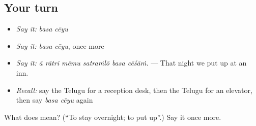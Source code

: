 \subsection*{Your turn}
\begin{itemize}
\raggedright
  \item \emph{Say it:} \emph{basa cēyu}
  \item \emph{Say it:} \emph{basa cēyu}, once more
  \item \emph{Say it:} \emph{ā rātri mēmu satraṁlō basa cēśāṁ.} — That night we put up at an inn.
  \item \emph{Recall:} say the Telugu for a reception desk, then the Telugu for an elevator, then say \emph{basa cēyu} again
\end{itemize}

\begin{tcolorbox}[breakable,colback=teal!4,colframe=teal!35!black,title={Before you move on}]
What does   mean? (\textquotedblleft{}To stay overnight; to put up\textquotedblright{}.) Say it once more.
\end{tcolorbox}
